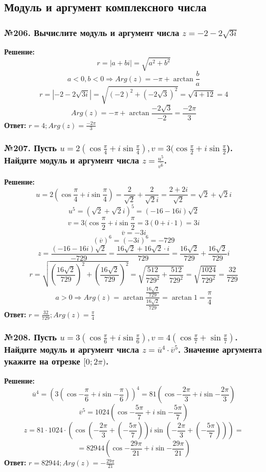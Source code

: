 \documentclass[a4paper]{article}
\begin{document}
\subsection*{Модуль и аргумент комплексного числа}
\subsubsection*{№206. Вычислите модуль и аргумент числа $z=-2-2\sqrt{3i}$}
\textbf{Решение:}
\[r=|a+bi|=\sqrt{a^2+b^2}\]
\[a<0, b<0 \Rightarrow Arg(z) = -\pi+\arctan{\frac{b}{a}}\]
\[r=|-2-2\sqrt{3i}|=\sqrt{(-2)^2+(-2\sqrt{3})^2}=\sqrt{4+12}=4\]
\[Arg(z)=-\pi+\arctan{\frac{-2\sqrt{3}}{-2}}=\frac{-2\pi}{3}\]
\textbf{Ответ:} $\displaystyle r=4; Arg(z)=\frac{-2\pi}{3}$

\subsubsection*{№207. Пусть $u=2(\cos{\frac{\pi}{4}}+i\sin{\frac{\pi}{4}}), v=3(\cos{\frac{\pi}{2}}+i\sin{\frac{\pi}{2}}$). Найдите модуль и аргумент числа $\displaystyle z=\frac{u^5}{\overline{v^6}}$.}
\textbf{Решение:}
\[u=2(\cos{\frac{\pi}{4}}+i\sin{\frac{\pi}{4}})=\frac{2}{\sqrt{2}}+\frac{2}{\sqrt{2}i}=\frac{2+2i}{\sqrt{2}}=\sqrt{2}+\sqrt{2}i\]
\[u^5=(\sqrt{2}+\sqrt{2}i)^5=(-16-16i)\sqrt{2}\]
\[v=3(\cos{\frac{\pi}{2}}+i\sin{\frac{\pi}{2}}=3(0+i\cdot1)=3i\]
\[\overline{v}=-3i\]
\[(\overline{v})^6=(-3i)^6=-729\]
\[z=\frac{(-16-16i)\sqrt{2}}{-729}=\frac{16\sqrt{2}+16\sqrt{2}\cdot i}{729}=\frac{16\sqrt{2}}{729}+\frac{16\sqrt{2}}{729}i\]
\[r=\sqrt{(\frac{16\sqrt{2}}{729})^2+(\frac{16\sqrt{2}}{729})^2}=\sqrt{\frac{512}{729^2}+\frac{512}{729^2}}=\sqrt{\frac{1024}{729^2}}=\frac{32}{729}\]
\[a>0 \Rightarrow Arg(z)=\arctan{\frac{\frac{16\sqrt{2}}{729}}{\frac{16\sqrt{2}}{729}}}=\arctan{1}=\frac{\pi}{4}\]
\textbf{Ответ:} $\displaystyle r=\frac{32}{729}; Arg(z)=\frac{\pi}{4}$

\subsubsection*{№208. Пусть $u=3(\cos{\frac{\pi}{6}}+i\sin{\frac{\pi}{6}}), v=4(\cos{\frac{\pi}{7}}+\sin{\frac{\pi}{7}})$. Найдите модуль и аргумент числа $\displaystyle z=\overline{u}^4\cdot\overline{v}^5$. Значение аргумента укажите на отрезке $[0;2\pi)$.}
\textbf{Решение:}
\[\overline{u}^4=(3(\cos{-\frac{\pi}{6}}+i\sin{-\frac{\pi}{6}}))^4=81(\cos{-\frac{2\pi}{3}}+i\sin{-\frac{2\pi}{3}})\]
\[\overline{v}^5=1024(\cos{-\frac{5\pi}{7}}+i\sin{-\frac{5\pi}{7}})\]
\[z=81\cdot1024\cdot(\cos{(-\frac{2\pi}{3}+(-\frac{5\pi}{7}))}i\sin{(-\frac{2\pi}{3}+(-\frac{5\pi}{7}))})=\]
\[=82944(\cos{-\frac{29\pi}{21}}+i\sin{-\frac{29\pi}{21}})\]
\textbf{Ответ:} $\displaystyle r=82944; Arg(z)=-\frac{29\pi}{21}$
\end{document}
